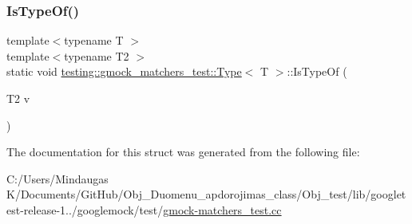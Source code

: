 \mbox{\label{structtesting_1_1gmock__matchers__test_1_1_type_a5451b10be4ff47bd2dc3741eb70dde59}} 
\subsubsection{\texorpdfstring{IsTypeOf()}{IsTypeOf()}\hspace{0.1cm}{\footnotesize\ttfamily [2/2]}}
{\footnotesize\ttfamily template$<$typename T $>$ \\
template$<$typename T2 $>$ \\
static void \mbox{\hyperlink{structtesting_1_1gmock__matchers__test_1_1_type}{testing\+::gmock\+\_\+matchers\+\_\+test\+::\+Type}}$<$ T $>$\+::Is\+Type\+Of (\begin{DoxyParamCaption}\item[{T2}]{v }\end{DoxyParamCaption})\hspace{0.3cm}{\ttfamily [static]}}



The documentation for this struct was generated from the following file\+:\begin{DoxyCompactItemize}
\item 
C\+:/\+Users/\+Mindaugas K/\+Documents/\+Git\+Hub/\+Obj\+\_\+\+Duomenu\+\_\+apdorojimas\+\_\+class/\+Obj\+\_\+test/lib/googletest-\/release-\/1../googlemock/test/\mbox{\hyperlink{_obj__test_2lib_2googletest-release-1_88_81_2googlemock_2test_2gmock-matchers__test_8cc}{gmock-\/matchers\+\_\+test.\+cc}}\end{DoxyCompactItemize}

